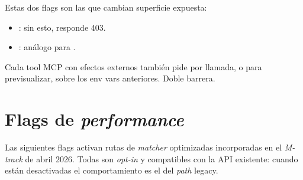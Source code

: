 Estas dos flags son las que cambian superficie expuesta:

\begin{itemize}
    \item {}: sin esto,
     responde 403.
    \item {}: análogo para
    .
\end{itemize}

Cada tool MCP con efectos externos también pide 
por llamada, o  para previsualizar, sobre los
env vars anteriores. Doble barrera.

\section{Flags de \emph{performance}}

Las siguientes flags activan rutas de \emph{matcher} optimizadas
incorporadas en el \emph{M-track} de abril 2026. Todas son
\emph{opt-in} y compatibles con la API existente: cuando están
desactivadas el comportamiento es el del \emph{path} legacy.

